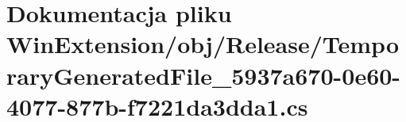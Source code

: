 \hypertarget{_win_extension_2obj_2_release_2_temporary_generated_file__5937a670-0e60-4077-877b-f7221da3dda1_8cs}{}\section{Dokumentacja pliku Win\+Extension/obj/\+Release/\+Temporary\+Generated\+File\+\_\+5937a670-\/0e60-\/4077-\/877b-\/f7221da3dda1.cs}
\label{_win_extension_2obj_2_release_2_temporary_generated_file__5937a670-0e60-4077-877b-f7221da3dda1_8cs}

